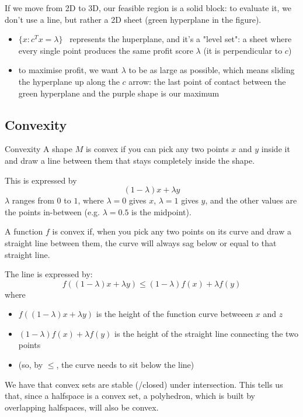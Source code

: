 \documentclass[a4paper, 11pt]{report}
\begin{document}
If we move from 2D to 3D, our feasible region is a solid block: to evaluate it, we don't use a line, but rather a 2D sheet (green hyperplane in the figure).

\begin{itemize}
    \item $\{x : c^T x = \lambda\}$ \ represents the huperplane, and it's a "level set": a sheet where every single point produces the same profit score $\lambda$ (it is perpendicular to $c$)
    \item to maximise profit, we want $\lambda$ to be as large as possible, which means sliding the hyperplane up along the $c$ arrow: the last point of contact between the green hyperplane and the purple shape is our maximum
\end{itemize}

\subsection{Convexity}
\begin{defframe}{Convexity}{}
A shape $M$ is convex if you can pick any two points $x$ and $y$ inside it and draw a line between them that stays completely inside the shape.

This is expressed by 
$$(1 - \lambda)x + \lambda y$$
$\lambda$ ranges from $0$ to $1$, where $\lambda = 0$ gives $x$, $\lambda = 1$ gives $y$, and the other values are the points in-between (e.g. $\lambda = 0.5$ is the midpoint).

\vspace{1em}
A function $f$ is convex if, when you pick any two points on its curve and draw a straight line between them, the curve will always sag below or equal to that straight line.

The line is expressed by:
$$f((1-\lambda)x + \lambda y) \leq (1-\lambda)f(x) + \lambda f(y)$$
where
\begin{itemize}
    \item $f((1-\lambda)x + \lambda y)$ is the height of the function curve betweeen $x$ and $z$
    \item $(1-\lambda)f(x) + \lambda f(y)$ is the height of the straight line connecting the two points
    \item (so, by $\leq $, the curve needs to sit below the line)
\end{itemize}
\end{defframe}

We have that convex sets are stable (/closed) under intersection. This tells us that, since a halfspace is a convex set, a polyhedron, which is built by overlapping halfspaces, will also be convex.
\end{document}
